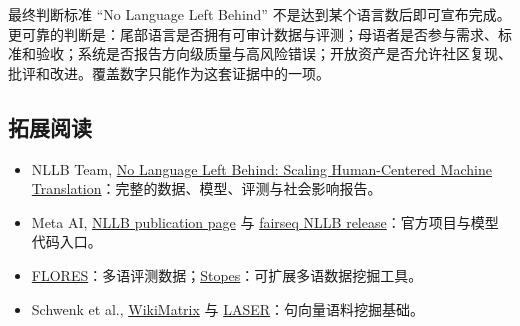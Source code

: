 \documentclass[a4paper]{article}
\begin{document}
\begin{importantbox}{最终判断标准}
“No Language Left Behind” 不是达到某个语言数后即可宣布完成。更可靠的判断是：尾部语言是否拥有可审计数据与评测；母语者是否参与需求、标准和验收；系统是否报告方向级质量与高风险错误；开放资产是否允许社区复现、批评和改进。覆盖数字只能作为这套证据中的一项。
\end{importantbox}

\subsection{拓展阅读}

\begingroup
\scriptsize
\begin{itemize}[itemsep=0pt,topsep=0.15em,parsep=0pt]
  \item NLLB Team, \href{https://arxiv.org/abs/2207.04672}{No Language Left Behind: Scaling Human-Centered Machine Translation}：完整的数据、模型、评测与社会影响报告。
  \item Meta AI, \href{https://research.facebook.com/publications/no-language-left-behind/}{NLLB publication page} 与 \href{https://github.com/facebookresearch/fairseq/tree/nllb}{fairseq NLLB release}：官方项目与模型代码入口。
  \item \href{https://github.com/facebookresearch/flores}{FLORES}：多语评测数据；\href{https://github.com/facebookresearch/stopes}{Stopes}：可扩展多语数据挖掘工具。
  \item Schwenk et al., \href{https://arxiv.org/abs/1907.05791}{WikiMatrix} 与 \href{https://github.com/facebookresearch/LASER}{LASER}：句向量语料挖掘基础。
\end{itemize}
\endgroup
\end{document}
